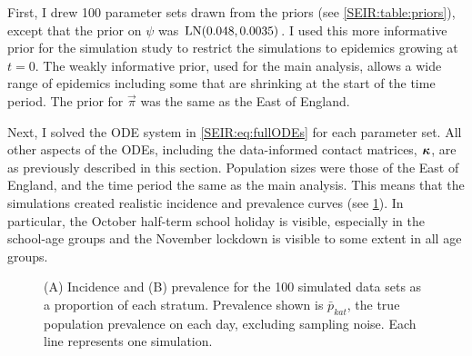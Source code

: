 \documentclass[thesis.tex]{subfiles}
\begin{document}
First, I drew 100 parameter sets drawn from the priors (see \cref{SEIR:table:priors}), except that the prior on $\psi$ was $\operatorname{LN}(0.048, 0.0035)$.
I used this more informative prior for the simulation study to restrict the simulations to epidemics growing at $t=0$.
The weakly informative prior, used for the main analysis, allows a wide range of epidemics including some that are shrinking at the start of the time period.
The prior for $\vec{\pi}$ was the same as the East of England.

Next, I solved the ODE system in \cref{SEIR:eq:fullODEs} for each parameter set.
All other aspects of the ODEs, including the data-informed contact matrices, $\bm{\kappa}$, are as previously described in this section.
Population sizes were those of the East of England, and the time period the same as the main analysis.
This means that the simulations created realistic incidence and prevalence curves (see \cref{SEIR:fig:sim-data}).
In particular, the October half-term school holiday is visible, especially in the school-age groups and the November lockdown is visible to some extent in all age groups.
\begin{figure}
    \caption[Simulated data]{%
        (A) Incidence and (B) prevalence for the 100 simulated data sets as a proportion of each stratum.
        Prevalence shown is $\bar{p}_{kat}$, the true population prevalence on each day, excluding sampling noise.
        Each line represents one simulation.
    }
    \label{SEIR:fig:sim-data}
\end{figure}
\end{document}
